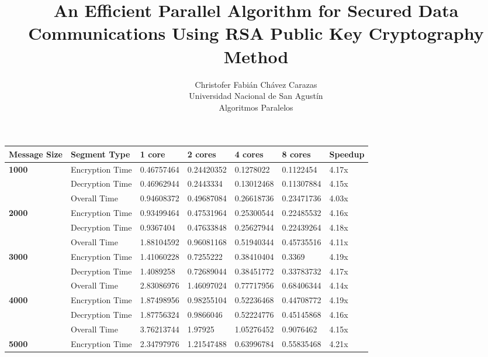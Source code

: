 \documentclass[landscape]{article}
\begin{document}
\title{An Efficient Parallel Algorithm for Secured Data Communications Using RSA Public Key Cryptography Method}
\author{
Christofer Fabián Chávez Carazas \\
\small{Universidad Nacional de San Agustín} \\
\small{Algoritmos Paralelos}
}

\maketitle

\begin{landscape}
\begin{tabular}{ | l | l | l | l | l | l | l | }
\hline
	\textbf{Message Size} & \textbf{Segment Type} & \textbf{1 core} & \textbf{2 cores} & \textbf{4 cores} & \textbf{8 cores} & \textbf{Speedup} \\ \hline
	\textbf{1000} & Encryption Time & 0.46757464 & 0.24420352 & 0.1278022 & 0.1122454 & 4.17x \\ \hline
	 & Decryption Time & 0.46962944 & 0.2443334 & 0.13012468 & 0.11307884 & 4.15x \\ \hline
	 & Overall Time & 0.94608372 & 0.49687084 & 0.26618736 & 0.23471736 & 4.03x \\ \hline
	\textbf{2000} & Encryption Time & 0.93499464 & 0.47531964 & 0.25300544 & 0.22485532 & 4.16x \\ \hline
	 & Decryption Time & 0.9367404 & 0.47633848 & 0.25627944 & 0.22439264 & 4.18x \\ \hline
	 & Overall Time & 1.88104592 & 0.96081168 & 0.51940344 & 0.45735516 & 4.11x \\ \hline
	\textbf{3000} & Encryption Time & 1.41060228 & 0.7255222 & 0.38410404 & 0.3369 & 4.19x \\ \hline
	 & Decryption Time & 1.4089258 & 0.72689044 & 0.38451772 & 0.33783732 & 4.17x \\ \hline
	 & Overall Time & 2.83086976 & 1.46097024 & 0.77717956 & 0.68406344 & 4.14x \\ \hline
	\textbf{4000} & Encryption Time & 1.87498956 & 0.98255104 & 0.52236468 & 0.44708772 & 4.19x \\ \hline
	 & Decryption Time & 1.87756324 & 0.9866046 & 0.52224776 & 0.45145868 & 4.16x \\ \hline
	 & Overall Time & 3.76213744 & 1.97925 & 1.05276452 & 0.9076462 & 4.15x \\ \hline
	\textbf{5000} & Encryption Time & 2.34797976 & 1.21547488 & 0.63996784 & 0.55835468 & 4.21x \\ \hline

\end{tabular}
\end{landscape}
\end{document}
